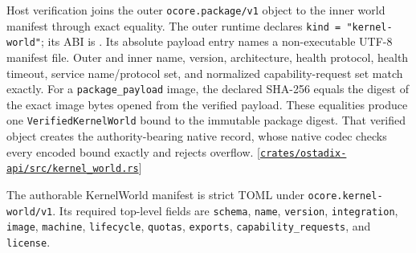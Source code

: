 \documentclass[11pt,oneside]{article}
\newcommand{\src}[1]{\textcolor{OSlate}{\scriptsize[\href{https://github.com/lostadi/OSTADIX/blob/c0b02c326b2329a95ba52447c7180bc93957cd57/#1}{\nolinkurl{#1}}]}\allowbreak}
\begin{document}
Host verification joins the outer \texttt{ocore.package/v1} object to the
inner world manifest through exact equality. The outer runtime declares
\texttt{kind = "kernel-world"}; its ABI is
. Its absolute payload entry
names a non-executable UTF-8 manifest file. Outer and inner name, version,
architecture, health protocol, health timeout, service name/protocol set, and
normalized capability-request set match exactly. For a
\texttt{package\_payload} image, the declared SHA-256 equals the digest of the
exact image bytes opened from the verified payload. These equalities produce
one \texttt{VerifiedKernelWorld} bound to the immutable package digest. That
verified object creates the authority-bearing native record, whose native
codec checks every encoded bound exactly and rejects overflow.
\src{crates/ostadix-api/src/kernel_world.rs}

The authorable KernelWorld manifest is strict TOML under
\texttt{ocore.kernel-world/v1}. Its required top-level fields are
\texttt{schema}, \texttt{name}, \texttt{version}, \texttt{integration},
\texttt{image}, \texttt{machine}, \texttt{lifecycle}, \texttt{quotas},
\texttt{exports}, \texttt{capability\_requests}, and \texttt{license}.
\end{document}
